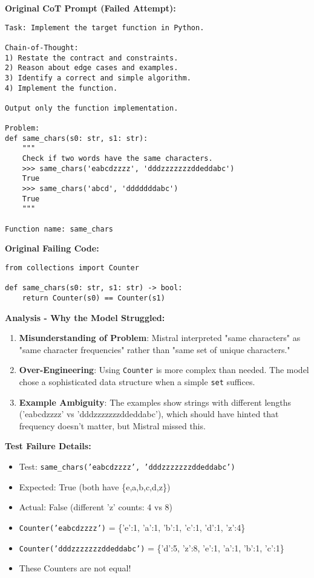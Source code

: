 \documentclass[11pt]{article}
\begin{document}
\textbf{Original CoT Prompt (Failed Attempt):}
\begin{lstlisting}
Task: Implement the target function in Python.

Chain-of-Thought:
1) Restate the contract and constraints.
2) Reason about edge cases and examples.
3) Identify a correct and simple algorithm.
4) Implement the function.

Output only the function implementation.

Problem:
def same_chars(s0: str, s1: str):
    """
    Check if two words have the same characters.
    >>> same_chars('eabcdzzzz', 'dddzzzzzzzddeddabc')
    True
    >>> same_chars('abcd', 'dddddddabc')
    True
    """

Function name: same_chars
\end{lstlisting}

\textbf{Original Failing Code:}
\begin{lstlisting}
from collections import Counter

def same_chars(s0: str, s1: str) -> bool:
    return Counter(s0) == Counter(s1)
\end{lstlisting}

\textbf{Analysis - Why the Model Struggled:}
\begin{enumerate}
    \item \textbf{Misunderstanding of Problem}: Mistral interpreted "same characters" as "same character frequencies" rather than "same set of unique characters."
    
    \item \textbf{Over-Engineering}: Using \texttt{Counter} is more complex than needed. The model chose a sophisticated data structure when a simple \texttt{set} suffices.
    
    \item \textbf{Example Ambiguity}: The examples show strings with different lengths ('eabcdzzzz' vs 'dddzzzzzzzddeddabc'), which should have hinted that frequency doesn't matter, but Mistral missed this.
\end{enumerate}

\textbf{Test Failure Details:}
\begin{itemize}
    \item Test: \texttt{same\_chars('eabcdzzzz', 'dddzzzzzzzddeddabc')}
    \item Expected: True (both have \{e,a,b,c,d,z\})
    \item Actual: False (different 'z' counts: 4 vs 8)
    \item \texttt{Counter('eabcdzzzz')} = \{'e':1, 'a':1, 'b':1, 'c':1, 'd':1, 'z':4\}
    \item \texttt{Counter('dddzzzzzzzddeddabc')} = \{'d':5, 'z':8, 'e':1, 'a':1, 'b':1, 'c':1\}
    \item These Counters are not equal!
\end{itemize}
\end{document}
